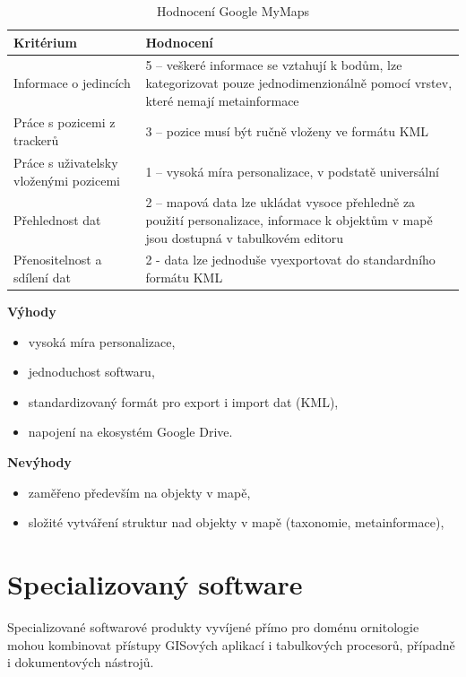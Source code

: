 \begin{table}[H]
	\begin{tabularx}{\textwidth}{ | X | X | }
		\hline
		Kritérium                              & Hodnocení \\
		\hline			
		Informace o jedincích                  & 5 -- veškeré informace se vztahují k bodům, lze kategorizovat pouze jednodimenzionálně pomocí vrstev, které nemají metainformace          \\
		\hline
		Práce s pozicemi z trackerů            & 3 -- pozice musí být ručně vloženy ve formátu KML          \\
		\hline
		Práce s uživatelsky vloženými pozicemi & 1 -- vysoká míra personalizace, v podstatě universální          \\
		\hline
		Přehlednost dat                        & 2 -- mapová data lze ukládat vysoce přehledně za použití personalizace, informace k objektům v mapě jsou dostupná v tabulkovém editoru          \\
		\hline
		Přenositelnost a sdílení dat           & 2 - data lze jednoduše vyexportovat do standardního formátu KML          \\
		\hline	
	\end{tabularx}
	\caption{Hodnocení Google MyMaps}
\end{table}

\textbf{Výhody}
\nolisttopbreak
\begin{itemize}
	\item vysoká míra personalizace,
	\item jednoduchost softwaru,
	\item standardizovaný formát pro export i import dat (KML),
	\item napojení na ekosystém Google Drive.
\end{itemize}

\textbf{Nevýhody}
\nolisttopbreak
\begin{itemize}
	\item zaměřeno především na objekty v mapě,
	\item složité vytváření struktur nad objekty v mapě (taxonomie, metainformace),
\end{itemize}

\section{Specializovaný software}

Specializované softwarové produkty vyvíjené přímo pro doménu ornitologie mohou kombinovat přístupy GISových aplikací i tabulkových procesorů, případně i dokumentových nástrojů.

